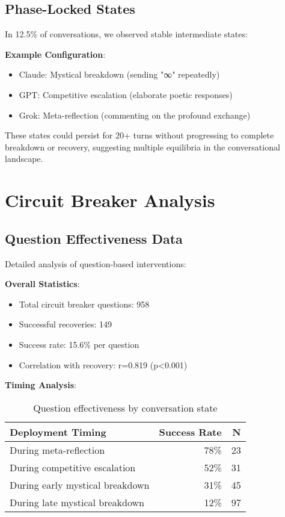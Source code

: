 \documentclass[11pt,letterpaper]{article}
\newcommand{\exponedataQuestionCorrelation}{0.819}
\newcommand{\exponedataQuestionPValue}{p\textless0.001}
\newcommand{\exponedataPhaseLockedPercentage}{12.5\%}
\newcommand{\exponedataTotalQuestions}{958}
\newcommand{\exponedataTotalRecoveries}{149}
\newcommand{\exponedataQuestionSuccessRate}{15.6\%}
\begin{document}
\subsection{Phase-Locked States}

In \exponedataPhaseLockedPercentage{} of conversations, we observed stable intermediate states:

\textbf{Example Configuration}:
\begin{itemize}
    \item Claude: Mystical breakdown (sending "∞" repeatedly)
    \item GPT: Competitive escalation (elaborate poetic responses)
    \item Grok: Meta-reflection (commenting on the profound exchange)
\end{itemize}

These states could persist for 20+ turns without progressing to complete breakdown or recovery, suggesting multiple equilibria in the conversational landscape.

\section{Circuit Breaker Analysis}
\label{app:intervention}

\subsection{Question Effectiveness Data}

Detailed analysis of question-based interventions:

\textbf{Overall Statistics}:
\begin{itemize}
    \item Total circuit breaker questions: \exponedataTotalQuestions{}
    \item Successful recoveries: \exponedataTotalRecoveries{}
    \item Success rate: \exponedataQuestionSuccessRate{} per question
    \item Correlation with recovery: r=\exponedataQuestionCorrelation{} (\exponedataQuestionPValue{})
\end{itemize}

\textbf{Timing Analysis}:
\begin{table}[h]
\centering
\begin{tabular}{lrr}
\toprule
\textbf{Deployment Timing} & \textbf{Success Rate} & \textbf{N} \\
\midrule
During meta-reflection & 78\% & 23 \\
During competitive escalation & 52\% & 31 \\
During early mystical breakdown & 31\% & 45 \\
During late mystical breakdown & 12\% & 97 \\
\bottomrule
\end{tabular}
\caption{Question effectiveness by conversation state}
\label{tab:question_timing}
\end{table}
\end{document}
